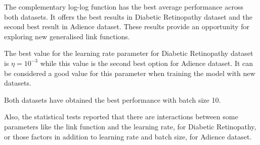 \documentclass[10pt, a4paper, titlepage, twocolumn]{article}
\begin{document}
	The complementary log-log function has the best average performance across both datasets. It offers the best results in Diabetic Retinopathy dataset and the second best result in Adience dataset. These results provide an opportunity for exploring new generalised link functions.
	
	The best value for the learning rate parameter for  Diabetic Retinopathy dataset is $\eta = 10^{-3}$ while this value is the second best option for Adience dataset. It can be considered a good value for this parameter when training the model with new datasets.
	
	Both datasets have obtained the best performance with batch size 10.
	
	Also, the statistical tests reported that there are interactions between some parameters like the link function and the learning rate, for Diabetic Retinopathy, or those factors in addition to learning rate and batch size, for Adience dataset.
	
	
	\printbibliography
\end{document}
